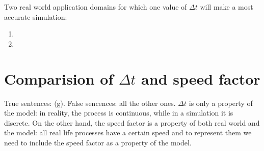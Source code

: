 \documentclass[a4paper]{article}
\begin{document}
Two real world application domains for which one value of $\Delta t$ will make a most accurate simulation:

\begin{enumerate}
\item 
\item 
\end{enumerate}

\section{Comparision of $\Delta t$ and speed factor}

True sentences: (g). False sencences: all the other ones.
$\Delta t$ is only a property of the model: in reality, the process is continuous, while in a simulation it is discrete. On the other hand, the speed factor is a property of both real world and the model: all real life processes have a certain speed and to represent them we need to include the speed factor as a property of the model.
\end{document}
